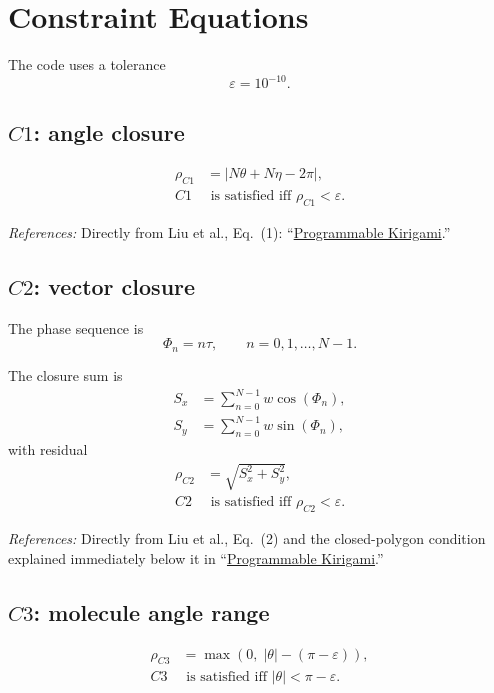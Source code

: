\documentclass[11pt]{article}
\newcommand{\formularefs}[1]{%
\par\smallskip
\noindent\footnotesize\textit{References: }#1
\par\smallskip\normalsize
}
\begin{document}
\section{Constraint Equations}

The code uses a tolerance
\[
\varepsilon = 10^{-10}.
\]

\subsection{$C1$: angle closure}

\begin{align}
\rho_{C1} &= \left|N\theta + N\eta - 2\pi\right|, \\
C1 &\text{ is satisfied iff } \rho_{C1} < \varepsilon.
\end{align}

\formularefs{Directly from Liu et al., Eq.~(1): ``\href{https://static1.squarespace.com/static/5783b6f903596e5098f3fce8/t/5dd2e95aee053940522eab1a/1574103423054/DETC2019-97557.pdf}{Programmable Kirigami}.''}

\subsection{$C2$: vector closure}

The phase sequence is
\[
\Phi_n = n\tau,
\qquad n=0,1,\dots,N-1.
\]

The closure sum is
\begin{align}
S_x &= \sum_{n=0}^{N-1} w\cos(\Phi_n), \\
S_y &= \sum_{n=0}^{N-1} w\sin(\Phi_n),
\end{align}
with residual
\begin{align}
\rho_{C2} &= \sqrt{S_x^2 + S_y^2}, \\
C2 &\text{ is satisfied iff } \rho_{C2} < \varepsilon.
\end{align}

\formularefs{Directly from Liu et al., Eq.~(2) and the closed-polygon condition explained immediately below it in ``\href{https://static1.squarespace.com/static/5783b6f903596e5098f3fce8/t/5dd2e95aee053940522eab1a/1574103423054/DETC2019-97557.pdf}{Programmable Kirigami}.''}

\subsection{$C3$: molecule angle range}

\begin{align}
\rho_{C3} &= \max\!\left(0,\; |\theta| - (\pi-\varepsilon)\right), \\
C3 &\text{ is satisfied iff } |\theta| < \pi-\varepsilon.
\end{align}
\end{document}
